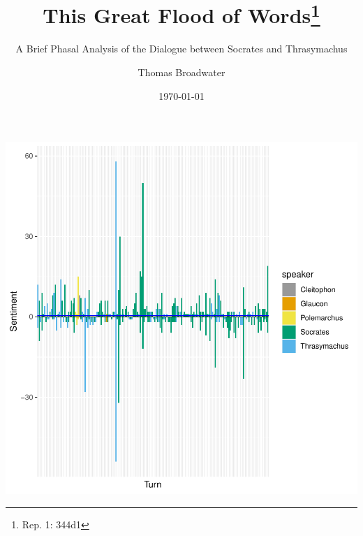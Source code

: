 \documentclass[noraggedright]{turabian-researchpaper}
\title{This Great Flood of Words\thanks{Rep. 1: 344d1}}
\subtitle{A Brief Phasal Analysis of the Dialogue between Socrates and Thrasymachus}
\author{Thomas Broadwater}
\date{\today}
\begin{document}




\maketitle


\includegraphics{GreatFlood-003}
\end{document}
